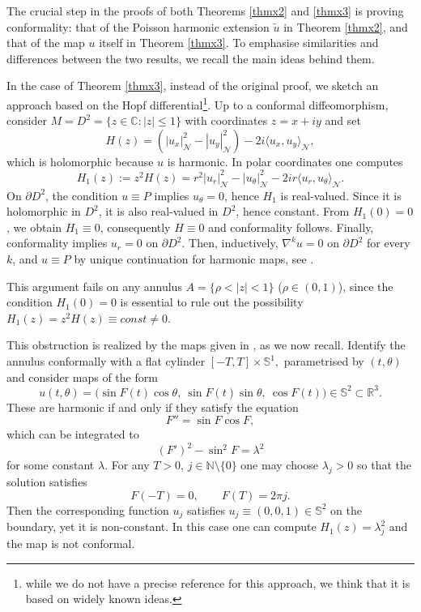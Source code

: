 \documentclass[12pt, a4paper]{article}
\newcommand{\sph}{\mathbb{S}}
\renewcommand{\(}{\left(}
\renewcommand{\)}{\right)}
\begin{document}
The crucial step in the proofs of both Theorems \ref{thmx2} and \ref{thmx3} is proving conformality: that of the Poisson harmonic extension $\tilde u$ in Theorem \ref{thmx2}, and that of the map $u$ itself in Theorem \ref{thmx3}. To emphasise similarities and differences between the two results, we recall the main ideas behind them.

In the case of Theorem \ref{thmx3}, instead of the original proof, we sketch an approach based on the Hopf differential\footnote{{while we do not have a precise reference for this approach, we think that it is based on widely known ideas.}}. Up to a conformal diffeomorphism, consider $M=D^2=\{z\in \mathbb{C}:|z|\le 1\}$ with coordinates $z=x+iy$ and set %
\begin{equation}\label{defH}
H(z)=\left(|u_x|^2_\mathcal{N}-|u_y|^2_\mathcal{N}\right)-2i\langle u_x, u_y\rangle_\mathcal{N},
\end{equation}
which is holomorphic because $u$ is harmonic.
In polar coordinates one computes
$$H_1(z):=z^2H(z) = r^2|u_r|^2_\mathcal{N}-|u_\theta|^2_\mathcal{N} -2ir\langle u_r,u_\theta\rangle_\mathcal{N}.$$
On $\partial D^2$, the condition $u\equiv P$ implies
$u_\theta=0$, hence $H_1$ is real-valued.
Since it is holomorphic in $D^2$, it is also real-valued in $D^2$, hence constant. From
$H_1(0)=0$, we obtain $H_1\equiv0$, consequently $H\equiv0$ and conformality follows. Finally, conformality implies $u_r=0$ on $\partial D^2$. Then, inductively, $\nabla^k u=0$ on $\partial D^2$ for every $k$, and $u\equiv P$ by unique continuation for harmonic maps, see \cite{Sam}.

This argument fails on any annulus $A=\{\rho<|z|<1\}$ ($\rho\in (0,1)$), since the condition $H_1(0)=0$ is essential to rule out the possibility $H_1(z)=z^2H(z)\equiv const\ne 0$.

This obstruction is realized by the maps given in \cite[Example 5.1]{lem}, as we now recall. Identify the annulus conformally with a flat cylinder
$ [-T,T]\times \sph^1,$ parametrised by $(t,\theta)$
and consider maps of the form
\[
        u(t,\theta)=
        \bigl(\sin F(t)\cos \theta,\ \sin F(t)\sin \theta,\ \cos F(t)\bigr)\in \sph^2\subset\mathbb{R}^3.
\]
These are harmonic if and only if they satisfy the equation
\[
        F''=\sin F\cos F ,
\]
which can be integrated to
\[
        (F')^2-\sin^2 F=\lambda^2
\]
for some constant $\lambda$. For any $T>0$, $j\in \mathbb{N}\setminus\{0\}$ one may choose
$\lambda_j>0$ so that the solution satisfies
\begin{equation}\label{condF}
F(-T)=0, \qquad F(T)=2\pi j .
\end{equation}
Then the corresponding function $u_j$ satisfies $u_j\equiv (0,0,1)\in \sph^2$ on the boundary, yet it is non-constant. In this case one can compute $H_1(z)=\lambda^2_j$ and the map is not conformal.
\end{document}
